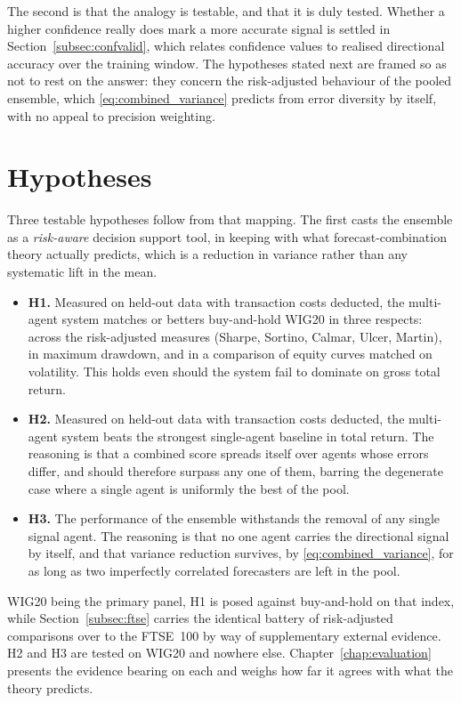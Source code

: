 The second is that the analogy is testable, and that it is duly tested. Whether a higher confidence really does mark a more accurate signal is settled in Section~\ref{subsec:confvalid}, which relates confidence values to realised directional accuracy over the training window. The hypotheses stated next are framed so as not to rest on the answer: they concern the risk-adjusted behaviour of the pooled ensemble, which \eqref{eq:combined_variance} predicts from error diversity by itself, with no appeal to precision weighting.

\section{Hypotheses}\label{sec:hypotheses}

Three testable hypotheses follow from that mapping. The first casts the ensemble as a \emph{risk-aware} decision support tool, in keeping with what forecast-combination theory actually predicts, which is a reduction in variance rather than any systematic lift in the mean.

\begin{itemize}
\item \textbf{H1.} Measured on held-out data with transaction costs deducted, the multi-agent system matches or betters buy-and-hold WIG20 in three respects: across the risk-adjusted measures (Sharpe, Sortino, Calmar, Ulcer, Martin), in maximum drawdown, and in a comparison of equity curves matched on volatility. This holds even should the system fail to dominate on gross total return.
\item \textbf{H2.} Measured on held-out data with transaction costs deducted, the multi-agent system beats the strongest single-agent baseline in total return. The reasoning is that a combined score spreads itself over agents whose errors differ, and should therefore surpass any one of them, barring the degenerate case where a single agent is uniformly the best of the pool.
\item \textbf{H3.} The performance of the ensemble withstands the removal of any single signal agent. The reasoning is that no one agent carries the directional signal by itself, and that variance reduction survives, by \eqref{eq:combined_variance}, for as long as two imperfectly correlated forecasters are left in the pool.
\end{itemize}

WIG20 being the primary panel, H1 is posed against buy-and-hold on that index, while Section~\ref{subsec:ftse} carries the identical battery of risk-adjusted comparisons over to the FTSE~100 by way of supplementary external evidence. H2 and H3 are tested on WIG20 and nowhere else. Chapter~\ref{chap:evaluation} presents the evidence bearing on each and weighs how far it agrees with what the theory predicts.

